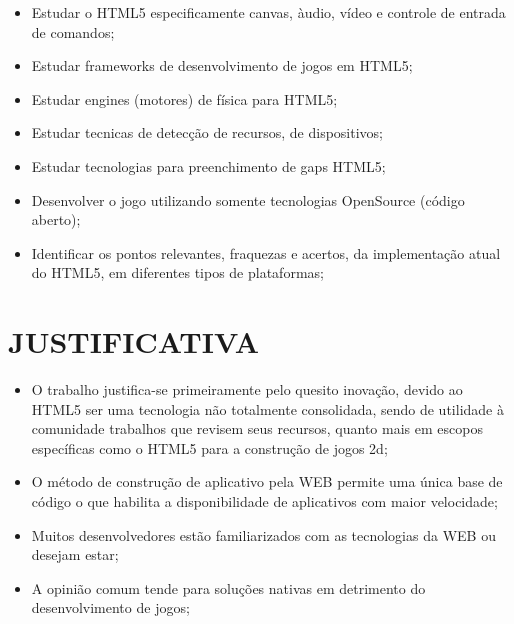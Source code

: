 \documentclass{article}
\begin{document}
\begin{itemize}
    \item Estudar o HTML5 especificamente canvas, àudio, vídeo e controle de entrada de comandos;
    \item Estudar frameworks de desenvolvimento de jogos em HTML5;

    \item Estudar engines (motores) de física para HTML5;

    \item Estudar tecnicas de detecção de recursos, de dispositivos;

    \item Estudar tecnologias para preenchimento de gaps HTML5;

    \item Desenvolver o jogo utilizando somente tecnologias OpenSource (código aberto);

    \item Identificar os pontos relevantes, fraquezas e acertos, da implementação atual do HTML5, em diferentes tipos de plataformas;


\end{itemize}

\section{JUSTIFICATIVA}


\begin{itemize}

    \item O trabalho justifica-se primeiramente pelo quesito inovação, devido ao HTML5 ser uma tecnologia não totalmente consolidada, sendo de utilidade à comunidade trabalhos que revisem seus recursos, quanto mais em escopos específicas como o HTML5 para a construção de jogos 2d;

    \item O método de construção de aplicativo pela WEB permite uma única base de código o que habilita a disponibilidade de aplicativos com maior velocidade;

    \item Muitos desenvolvedores estão familiarizados com as tecnologias da WEB ou desejam estar;

    \item A opinião comum tende para soluções nativas em detrimento do desenvolvimento de jogos;
    

\end{itemize}
\end{document}
